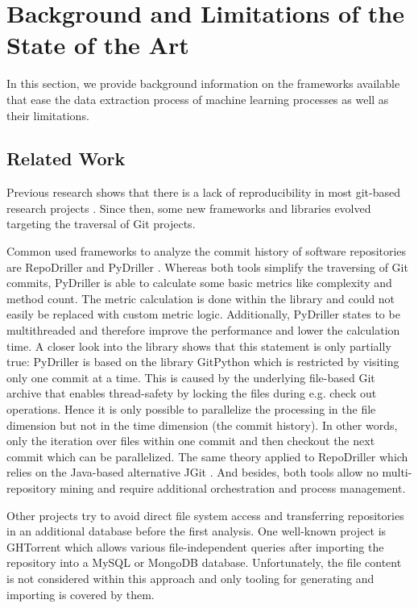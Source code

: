 
\section{Background and Limitations of the State of the Art}
\label{sec:background}
In this section, we provide background information on the frameworks available that ease the data extraction process of machine learning processes as well as their limitations.

\subsection{Related Work}
Previous research shows that there is a lack of reproducibility in most git-based research projects \cite{Robles2010}. Since then, some new frameworks and libraries evolved targeting the traversal of Git projects.

Common used frameworks to analyze the commit history of software repositories are RepoDriller \cite{repodriller} and PyDriller \cite{pydriller,Spadini2018}. Whereas both tools simplify the traversing of Git commits, PyDriller is able to calculate some basic metrics like complexity and method count. The metric calculation is done within the library and could not easily be replaced with custom metric logic. Additionally, PyDriller states to be multithreaded and therefore improve the performance and lower the calculation time. A closer look into the library shows that this statement is only partially true: PyDriller is based on the library GitPython which is restricted by visiting only one commit at a time. This is caused by the underlying file-based Git archive that enables thread-safety by locking the files during e.g. check out operations. Hence it is only possible to parallelize the processing in the file dimension but not in the time dimension (the commit history). In other words, only the iteration over files within one commit and then checkout the next commit which can be parallelized. The same theory applied to RepoDriller which relies on the Java-based alternative JGit \cite{jgit}. And besides, both tools allow no multi-repository mining and require additional orchestration and process management.

Other projects try to avoid direct file system access and transferring repositories in an additional database before the first analysis. One well-known project is GHTorrent \cite{Gousios2012, Gousios2015} which allows various file-independent queries after importing the repository into a MySQL or MongoDB database. Unfortunately, the file content is not considered within this approach and only tooling for generating and importing is covered by them. 

